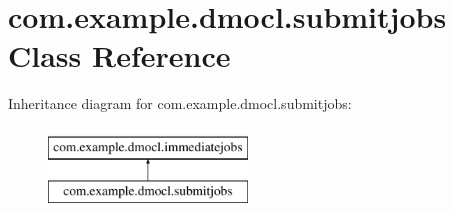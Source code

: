 \hypertarget{classcom_1_1example_1_1dmocl_1_1submitjobs}{}\section{com.\+example.\+dmocl.\+submitjobs Class Reference}
\label{classcom_1_1example_1_1dmocl_1_1submitjobs}
Inheritance diagram for com.\+example.\+dmocl.\+submitjobs\+:\begin{figure}[H]
\begin{center}
\leavevmode
\includegraphics[height=2.000000cm]{classcom_1_1example_1_1dmocl_1_1submitjobs}
\end{center}
\end{figure}
